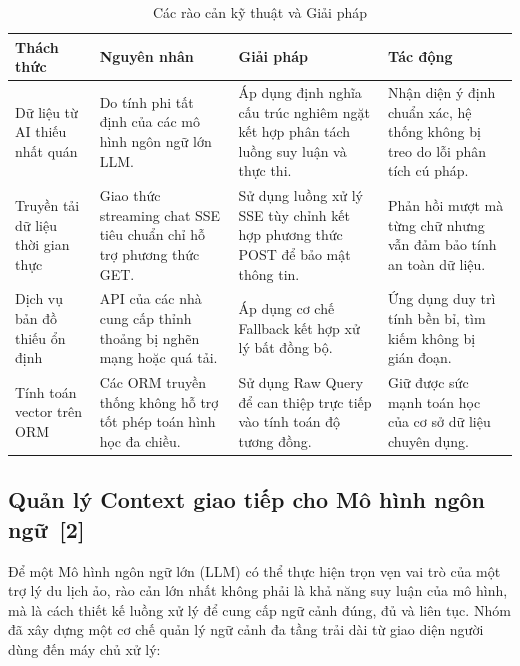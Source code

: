 \documentclass[12pt, a4paper]{article}
\begin{document}
\begin{table}[H]
    \centering
    \renewcommand{\arraystretch}{1.5}
    \begin{tabularx}{\textwidth}{|>{\raggedright\arraybackslash}p{3cm}|>{\raggedright\arraybackslash}p{3cm}|>{\raggedright\arraybackslash}p{4cm}|X|}
        \hline
        \textbf{Thách thức} & \textbf{Nguyên nhân} & \textbf{Giải pháp} & \textbf{Tác động} \\
        \hline
        Dữ liệu từ AI thiếu nhất quán & Do tính phi tất định của các mô hình ngôn ngữ lớn LLM. & Áp dụng định nghĩa cấu trúc nghiêm ngặt kết hợp phân tách luồng suy luận và thực thi. & Nhận diện ý định chuẩn xác, hệ thống không bị treo do lỗi phân tích cú pháp. \\
        \hline
        Truyền tải dữ liệu thời gian thực & Giao thức streaming chat SSE tiêu chuẩn chỉ hỗ trợ phương thức GET. & Sử dụng luồng xử lý SSE tùy chỉnh kết hợp phương thức POST để bảo mật thông tin. & Phản hồi mượt mà từng chữ nhưng vẫn đảm bảo tính an toàn dữ liệu. \\
        \hline
        Dịch vụ bản đồ thiếu ổn định & API của các nhà cung cấp thỉnh thoảng bị nghẽn mạng hoặc quá tải. & Áp dụng cơ chế Fallback kết hợp xử lý bất đồng bộ. & Ứng dụng duy trì tính bền bỉ, tìm kiếm không bị gián đoạn. \\
        \hline
        Tính toán vector trên ORM & Các ORM truyền thống không hỗ trợ tốt phép toán hình học đa chiều. & Sử dụng Raw Query để can thiệp trực tiếp vào tính toán độ tương đồng. & Giữ được sức mạnh toán học của cơ sở dữ liệu chuyên dụng. \\
        \hline
    \end{tabularx}
    \caption{Các rào cản kỹ thuật và Giải pháp}
    \label{tab:challenges}
\end{table}

\subsection[Quản lý Context cho Mô hình ngôn ngữ]{Quản lý Context giao tiếp cho Mô hình ngôn ngữ \,{\normalfont\small\textcolor{cyan!70!black}{[2]}}}

\label{sec:llm_context}
Để một Mô hình ngôn ngữ lớn (LLM) có thể thực hiện trọn vẹn vai trò của một trợ lý du lịch ảo, rào cản lớn nhất không phải là khả năng suy luận của mô hình, mà là cách thiết kế luồng xử lý để cung cấp ngữ cảnh đúng, đủ và liên tục. Nhóm đã xây dựng một cơ chế quản lý ngữ cảnh đa tầng trải dài từ giao diện người dùng đến máy chủ xử lý:
\end{document}
